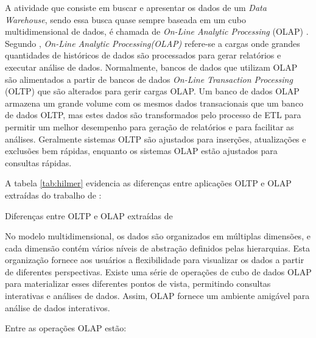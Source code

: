A atividade que consiste em buscar e apresentar os dados de um \textit{Data Warehouse}, sendo essa busca quase sempre baseada em um cubo multidimensional de dados, é chamada de \textit{On-Line Analytic Processing} (OLAP) \cite{Kimball2002}. Segundo , \textit{On-Line Analytic Processing(OLAP)} refere-se a cargas onde grandes quantidades de históricos de dados são processados para gerar relatórios e executar análise de dados. Normalmente, bancos de dados que utilizam OLAP são alimentados a partir de bancos de dados \textit{On-Line Transaction Processing} (OLTP) que são alterados para gerir cargas OLAP. Um banco de dados OLAP armazena um grande volume com os mesmos dados transacionais que um banco de dados OLTP, mas estes dados são transformados pelo processo de ETL para permitir um melhor desempenho para geração de relatórios e para facilitar as análises. Geralmente sistemas OLTP são ajustados para inserções, atualizações e exclusões bem rápidas, enquanto os sistemas OLAP estão ajustados para consultas rápidas.

A tabela \ref{tab:hilmer} evidencia as diferenças entre aplicações OLTP e OLAP extraídas do trabalho de \cite{hilmer2002}: 

\begin{table}[!ht]
	\begin{center}
	
	 
	\caption{Diferenças entre OLTP e OLAP extraídas de }
	\label{tab:hilmer}
	\end{center}
	\end{table}	
	\FloatBarrier
	
	
No modelo multidimensional, os dados são organizados em múltiplas dimensões, e cada dimensão contém vários níveis de abstração definidos pelas hierarquias. Esta organização fornece aos usuários a flexibilidade para visualizar os dados a partir de diferentes perspectivas. Existe uma série de operações de cubo de dados OLAP para materializar esses diferentes pontos de vista, permitindo consultas interativas e análises de dados. Assim, OLAP fornece um ambiente amigável para análise de dados interativos.

Entre as operações OLAP estão:	


